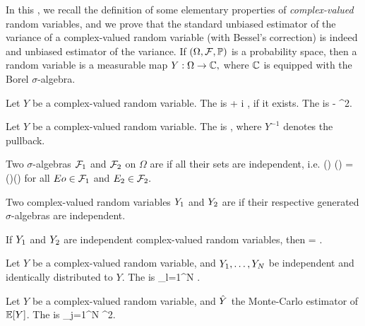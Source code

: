 In this , we recall the definition of some elementary properties of \emph{complex-valued} random variables, and we prove that the standard unbiased estimator of the variance of a complex-valued random variable (with Bessel's correction) is indeed and unbiased estimator of the variance.
If $\OFP$ is a probability space, then a  random variable is a measurable map $Y:\Omega\rightarrow \mathbb C,$ where $\mathbb C$ is equipped with the Borel $\sigma$-algebra.
\ede

Let $Y$ be a complex-valued random variable. The  is
\beqs
{} \de {} + i ,
\eeqs
if it exists. The  is
\beqs
{} \de {} - ^2.
\eeqs
\ede

Let $Y$ be a complex-valued random variable. The  is
\beqs
{} \de {},
\eeqs
where $Y^{-1}$ denotes the pullback.
\ede

Two $\sigma$-algebras $\mathcal F_{1}$ and $\mathcal F_{2}$ on $\Omega$ are  if all their sets are independent, i.e.
\beqs
\PP\mleft(\Eo\mright) \cap \PP\mleft(\Et\mright) = \PP\mleft(\Eo\mright)\PP\mleft(\Et\mright)
\eeqs
for all $Eo \in \mathcal F_{1}$ and $E_{2} \in \mathcal F_{2}.$
\ede

Two complex-valued random variables $Y_{1}$ and $Y_{2}$ are  if their respective generated $\sigma$-algebras are independent.
\ede

If $Y_{1}$ and $Y_{2}$ are independent complex-valued random variables, then
\beqs
\EXP{\Yo\Ytbar} = \EXP{\Yo}\EXP{\Ytbar}.
\eeqs
\ele

Let $Y$ be a complex-valued random variable, and $Y_{1},\ldots,Y_{N}$ be independent and identically distributed to $Y$. The  is
\beqs
\Yhat \de \sum_{l=1}^N \Yl.
\eeqs
\ede

Let $Y$ be a complex-valued random variable, and $\hat{Y}$ the Monte-Carlo estimator of $\EXP{Y}$. The  is
\beqs
{} \de {} \sum_{j=1}^N \abs{\Yj - \Yhat}^2.
\eeqs
\ede

